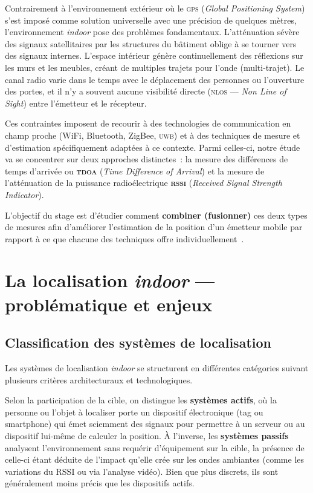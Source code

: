\documentclass[12pt, a4paper]{article}
\newcommand{\TDOA}{\textsc{tdoa}}
\newcommand{\RSSI}{\textsc{rssi}}
\newcommand{\UWB}{\textsc{uwb}}
\newcommand{\NLOS}{\textsc{nlos}}
\newcommand{\GPS}{\textsc{gps}}
\begin{document}
Contrairement à l'environnement extérieur où le \GPS{} (\textit{Global Positioning
System}) s'est imposé comme solution universelle avec une précision de quelques
mètres, l'environnement \textit{indoor} pose des problèmes fondamentaux. L'atténuation
sévère des signaux satellitaires par les structures du bâtiment oblige à se
tourner vers des signaux internes. L'espace intérieur génère continuellement des
réflexions sur les murs et les meubles, créant de multiples trajets pour l'onde (multi-trajet).
Le canal radio varie dans le temps avec le déplacement des personnes ou l'ouverture
des portes, et il n'y a souvent aucune visibilité directe (\NLOS{} — \textit{Non Line of Sight})
entre l'émetteur et le récepteur.

Ces contraintes imposent de recourir à des technologies de communication en champ
proche (WiFi, Bluetooth, ZigBee, \UWB{}) et à des techniques de mesure et
d'estimation spécifiquement adaptées à ce contexte. Parmi celles-ci, notre étude va se concentrer sur deux approches distinctes~:
la mesure des différences de temps d'arrivée ou \textbf{\TDOA{}} (\textit{Time Difference of Arrival}) et la mesure de l'atténuation de la puissance radioélectrique \textbf{\RSSI{}} (\textit{Received Signal Strength Indicator}).

L'objectif du stage est d'étudier comment \textbf{combiner (fusionner)} ces deux
types de mesures afin d'améliorer l'estimation de la position d'un émetteur mobile
par rapport à ce que chacune des techniques offre individuellement~\cite{Deak2012,
Mitilineos2010, Xiao2016, Klingbeil2008}.

\section{La localisation \textit{indoor} — problématique et enjeux}

\subsection{Classification des systèmes de localisation}

Les systèmes de localisation \textit{indoor} se structurent en différentes catégories suivant plusieurs critères architecturaux et technologiques.

Selon la participation de la cible, on distingue les \textbf{systèmes actifs}, où la personne ou l'objet à localiser porte un dispositif électronique (tag ou smartphone) qui émet sciemment des signaux pour permettre à un serveur ou au dispositif lui-même de calculer la position. À l'inverse, les \textbf{systèmes passifs} analysent l'environnement sans requérir d'équipement sur la cible, la présence de celle-ci étant déduite de l'impact qu'elle crée sur les ondes ambiantes (comme les variations du RSSI ou via l'analyse vidéo). Bien que plus discrets, ils sont généralement moins précis que les dispositifs actifs.
\end{document}

